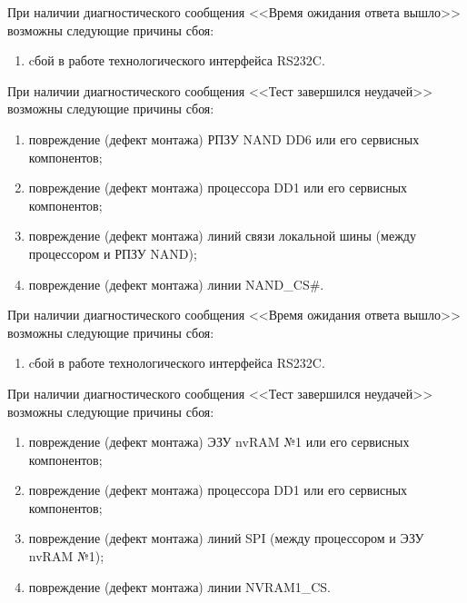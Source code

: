     \subpoint При наличии диагностического сообщения <<Время ожидания ответа вышло>> возможны следующие причины сбоя:
      \begin{enumerate}	  
	\item cбой в работе технологического интерфейса RS232C.
      \end{enumerate}
      
    \subpoint При наличии диагностического сообщения <<Тест завершился неудачей>> возможны следующие причины сбоя:
      \begin{enumerate}
	\item повреждение (дефект монтажа) РПЗУ NAND DD6 или его сервисных компонентов;
	\item повреждение (дефект монтажа) процессора DD1 или его сервисных компонентов;
	\item повреждение (дефект монтажа) линий связи локальной шины (между процессором и РПЗУ NAND);
	\item повреждение (дефект монтажа) линии NAND\_CS\#.
      \end{enumerate}
      
    \subpoint При наличии диагностического сообщения <<Время ожидания ответа вышло>> возможны следующие причины сбоя:
      \begin{enumerate}
	\item cбой в работе технологического интерфейса RS232C.
      \end{enumerate}   
      
    \subpoint При наличии диагностического сообщения <<Тест завершился неудачей>> возможны следующие причины сбоя:
      \begin{enumerate}
	\item повреждение (дефект монтажа) ЭЗУ nvRAM №1 или его сервисных компонентов;
	\item повреждение (дефект монтажа) процессора DD1 или его сервисных компонентов;
	\item повреждение (дефект монтажа) линий SPI (между процессором и ЭЗУ nvRAM №1);
	\item повреждение (дефект монтажа) линии NVRAM1\_CS.
      \end{enumerate}
      
